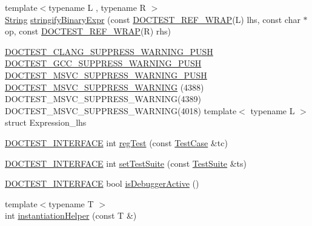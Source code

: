 \begin{DoxyCompactItemize}
\item 
{\footnotesize template$<$typename L , typename R $>$ }\\\hyperlink{classdoctest_1_1_string}{String} \hyperlink{namespacedoctest_1_1detail_a6879a79aea397a22e296e4afd0a90e3b}{stringify\+Binary\+Expr} (const \hyperlink{doctest_8h_af2901cafb023c57fb672ccb1bf14f2eb}{D\+O\+C\+T\+E\+S\+T\+\_\+\+R\+E\+F\+\_\+\+W\+R\+AP}(L) lhs, const char $\ast$op, const \hyperlink{doctest_8h_af2901cafb023c57fb672ccb1bf14f2eb}{D\+O\+C\+T\+E\+S\+T\+\_\+\+R\+E\+F\+\_\+\+W\+R\+AP}(R) rhs)
\item 
\hyperlink{doctest_8h_a628491cf2971a026350d5401986bf6d3}{D\+O\+C\+T\+E\+S\+T\+\_\+\+C\+L\+A\+N\+G\+\_\+\+S\+U\+P\+P\+R\+E\+S\+S\+\_\+\+W\+A\+R\+N\+I\+N\+G\+\_\+\+P\+U\+SH} \hyperlink{doctest_8h_a8015d10af2883db80a955ce0d523886d}{D\+O\+C\+T\+E\+S\+T\+\_\+\+G\+C\+C\+\_\+\+S\+U\+P\+P\+R\+E\+S\+S\+\_\+\+W\+A\+R\+N\+I\+N\+G\+\_\+\+P\+U\+SH} \hyperlink{doctest_8h_aec6d713a9dde361b8e68afe78c5bf3cf}{D\+O\+C\+T\+E\+S\+T\+\_\+\+M\+S\+V\+C\+\_\+\+S\+U\+P\+P\+R\+E\+S\+S\+\_\+\+W\+A\+R\+N\+I\+N\+G\+\_\+\+P\+U\+SH} \hyperlink{namespacedoctest_1_1detail_a3b966d87ac1e25498fae773355c43d90}{D\+O\+C\+T\+E\+S\+T\+\_\+\+M\+S\+V\+C\+\_\+\+S\+U\+P\+P\+R\+E\+S\+S\+\_\+\+W\+A\+R\+N\+I\+NG} (4388) D\+O\+C\+T\+E\+S\+T\+\_\+\+M\+S\+V\+C\+\_\+\+S\+U\+P\+P\+R\+E\+S\+S\+\_\+\+W\+A\+R\+N\+I\+NG(4389) D\+O\+C\+T\+E\+S\+T\+\_\+\+M\+S\+V\+C\+\_\+\+S\+U\+P\+P\+R\+E\+S\+S\+\_\+\+W\+A\+R\+N\+I\+NG(4018) template$<$ typename L $>$ struct Expression\+\_\+lhs
\item 
\hyperlink{doctest_8h_a9c16ffc635ec47f07797d21ede26b1a5}{D\+O\+C\+T\+E\+S\+T\+\_\+\+I\+N\+T\+E\+R\+F\+A\+CE} int \hyperlink{namespacedoctest_1_1detail_a00f99edefb8490a8e2602d58c96431f4}{reg\+Test} (const \hyperlink{structdoctest_1_1detail_1_1_test_case}{Test\+Case} \&tc)
\item 
\hyperlink{doctest_8h_a9c16ffc635ec47f07797d21ede26b1a5}{D\+O\+C\+T\+E\+S\+T\+\_\+\+I\+N\+T\+E\+R\+F\+A\+CE} int \hyperlink{namespacedoctest_1_1detail_ae79cb8df06d35468dd0ba9f04c85802c}{set\+Test\+Suite} (const \hyperlink{structdoctest_1_1detail_1_1_test_suite}{Test\+Suite} \&ts)
\item 
\hyperlink{doctest_8h_a9c16ffc635ec47f07797d21ede26b1a5}{D\+O\+C\+T\+E\+S\+T\+\_\+\+I\+N\+T\+E\+R\+F\+A\+CE} bool \hyperlink{namespacedoctest_1_1detail_a013828c4e677241cc26aeea33f762710}{is\+Debugger\+Active} ()
\item 
{\footnotesize template$<$typename T $>$ }\\int \hyperlink{namespacedoctest_1_1detail_aad401b097a9af4df1d4a9d0911957c0f}{instantiation\+Helper} (const T \&)

\end{DoxyCompactItemize}
